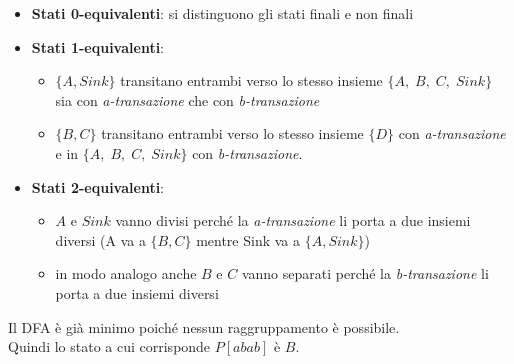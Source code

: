 \documentclass[11pt]{article}
\begin{document}
\begin{tcolorbox}[colframe=orange!70!black, colback=orange!10!white, title=\textbf{\textit{Spiegazione}}]
\begin{itemize}
    \item \textbf{Stati 0-equivalenti}: si distinguono gli stati finali e non finali
    \item \textbf{Stati 1-equivalenti}: 
    \begin{itemize}
      \item $\{A, Sink\}$ transitano entrambi verso lo stesso insieme $\{A,\;B,\;C,\;Sink\}$ sia con \textit{a-transazione} che con \textit{b-transazione}
      \item $\{B, C\}$ transitano entrambi verso lo stesso insieme $\{D\}$ con \textit{a-transazione} e in $\{A,\;B,\;C,\;Sink\}$ con \textit{b-transazione}.
    \end{itemize}
    \item \textbf{Stati 2-equivalenti}:
    \begin{itemize}
      \item $A$ e $Sink$ vanno divisi perché la \textit{a-transazione} li porta a due insiemi diversi (A va a $\{B, C\}$ mentre Sink va a $\{A, Sink\}$)
      \item in modo analogo anche $B$ e $C$ vanno separati perché la \textit{b-transazione} li porta a due insiemi diversi
    \end{itemize}
\end{itemize}
\end{tcolorbox}
\noindent 
Il DFA è già minimo poiché nessun raggruppamento è possibile. \\
Quindi lo stato a cui corrisponde $P[abab]$ è $B$.
\end{document}
